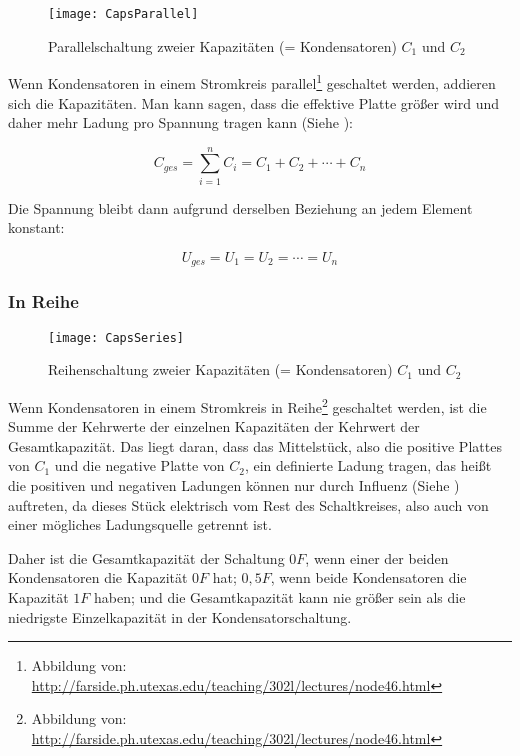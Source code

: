 \begin{figure}[h!]
	\centering
	\texttt{[image: CapsParallel]}
	\caption{Parallelschaltung zweier Kapazitäten (= Kondensatoren) $C_1$ und $C_2$}
\end{figure}

Wenn Kondensatoren in einem Stromkreis parallel\footnote{Abbildung von: \url{http://farside.ph.utexas.edu/teaching/302l/lectures/node46.html}} geschaltet werden, addieren sich die Kapazitäten. Man kann sagen, dass die effektive Platte größer wird und daher mehr Ladung pro Spannung tragen kann (Siehe ):

\begin{equation}
	C_{ges} = \sum\limits_{i=1}^n C_i = C_1 + C_2 + \cdots + C_n
\end{equation}

\noindent Die Spannung bleibt dann aufgrund derselben Beziehung an jedem Element konstant:

\begin{equation}
	U_{ges} = U_1 = U_2 = \cdots = U_n
\end{equation}


\subsubsection{In Reihe}

\begin{figure}[h!]
	\centering
	\texttt{[image: CapsSeries]}
	\caption{Reihenschaltung zweier Kapazitäten (= Kondensatoren) $C_1$ und $C_2$}
\end{figure}

Wenn Kondensatoren in einem Stromkreis in Reihe\footnote{Abbildung von: \url{http://farside.ph.utexas.edu/teaching/302l/lectures/node46.html}} geschaltet werden, ist die Summe der Kehrwerte der einzelnen Kapazitäten der Kehrwert der Gesamtkapazität. Das liegt daran, dass das \glqq Mittelstück\grqq , also die positive Plattes von $C_1$ und die negative Platte von $C_2$, ein definierte Ladung tragen, das heißt die positiven und negativen Ladungen können nur durch Influenz (Siehe ) auftreten, da dieses Stück elektrisch vom Rest des Schaltkreises, also auch von einer mögliches Ladungsquelle getrennt ist.

Daher ist die Gesamtkapazität der Schaltung $0F$, wenn einer der beiden Kondensatoren die Kapazität $0F$ hat; $0,5F$, wenn beide Kondensatoren die Kapazität $1F$ haben; und die Gesamtkapazität kann nie größer sein als die niedrigste Einzelkapazität in der Kondensatorschaltung.

